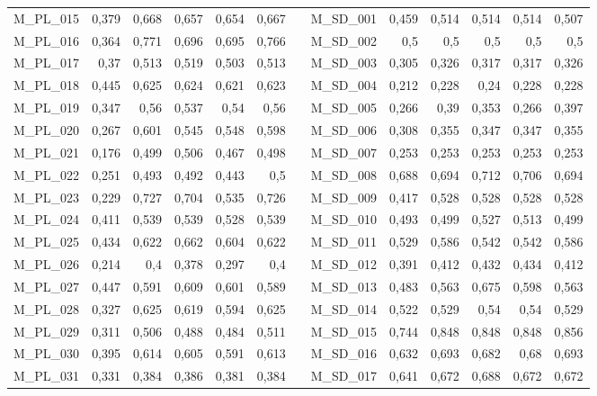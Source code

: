 \begin{table}[hp]
\begin{adjustbox}{angle=90}
\begin{tabular}{lrrrrrrrrrrrr}
    M\_PL\_015 & 0,379 & 0,668 & 0,657 & 0,654 & 0,667 &      & M\_SD\_001 & 0,459 & 0,514 & 0,514 & 0,514 & 0,507 \\
    M\_PL\_016 & 0,364 & 0,771 & 0,696 & 0,695 & 0,766 &      & M\_SD\_002 & 0,5  & 0,5  & 0,5  & 0,5  & 0,5 \\
    M\_PL\_017 & 0,37 & 0,513 & 0,519 & 0,503 & 0,513 &      & M\_SD\_003 & 0,305 & 0,326 & 0,317 & 0,317 & 0,326 \\
    M\_PL\_018 & 0,445 & 0,625 & 0,624 & 0,621 & 0,623 &      & M\_SD\_004 & 0,212 & 0,228 & 0,24 & 0,228 & 0,228 \\
    M\_PL\_019 & 0,347 & 0,56 & 0,537 & 0,54 & 0,56 &      & M\_SD\_005 & 0,266 & 0,39 & 0,353 & 0,266 & 0,397 \\
    M\_PL\_020 & 0,267 & 0,601 & 0,545 & 0,548 & 0,598 &      & M\_SD\_006 & 0,308 & 0,355 & 0,347 & 0,347 & 0,355 \\
    M\_PL\_021 & 0,176 & 0,499 & 0,506 & 0,467 & 0,498 &      & M\_SD\_007 & 0,253 & 0,253 & 0,253 & 0,253 & 0,253 \\
    M\_PL\_022 & 0,251 & 0,493 & 0,492 & 0,443 & 0,5  &      & M\_SD\_008 & 0,688 & 0,694 & 0,712 & 0,706 & 0,694 \\
    M\_PL\_023 & 0,229 & 0,727 & 0,704 & 0,535 & 0,726 &      & M\_SD\_009 & 0,417 & 0,528 & 0,528 & 0,528 & 0,528 \\
    M\_PL\_024 & 0,411 & 0,539 & 0,539 & 0,528 & 0,539 &      & M\_SD\_010 & 0,493 & 0,499 & 0,527 & 0,513 & 0,499 \\
    M\_PL\_025 & 0,434 & 0,622 & 0,662 & 0,604 & 0,622 &      & M\_SD\_011 & 0,529 & 0,586 & 0,542 & 0,542 & 0,586 \\
    M\_PL\_026 & 0,214 & 0,4  & 0,378 & 0,297 & 0,4  &      & M\_SD\_012 & 0,391 & 0,412 & 0,432 & 0,434 & 0,412 \\
    M\_PL\_027 & 0,447 & 0,591 & 0,609 & 0,601 & 0,589 &      & M\_SD\_013 & 0,483 & 0,563 & 0,675 & 0,598 & 0,563 \\
    M\_PL\_028 & 0,327 & 0,625 & 0,619 & 0,594 & 0,625 &      & M\_SD\_014 & 0,522 & 0,529 & 0,54 & 0,54 & 0,529 \\
    M\_PL\_029 & 0,311 & 0,506 & 0,488 & 0,484 & 0,511 &      & M\_SD\_015 & 0,744 & 0,848 & 0,848 & 0,848 & 0,856 \\
    M\_PL\_030 & 0,395 & 0,614 & 0,605 & 0,591 & 0,613 &      & M\_SD\_016 & 0,632 & 0,693 & 0,682 & 0,68 & 0,693 \\
    M\_PL\_031 & 0,331 & 0,384 & 0,386 & 0,381 & 0,384 &      & M\_SD\_017 & 0,641 & 0,672 & 0,688 & 0,672 & 0,672 \\

\end{tabular}
\end{adjustbox}
\end{table}
